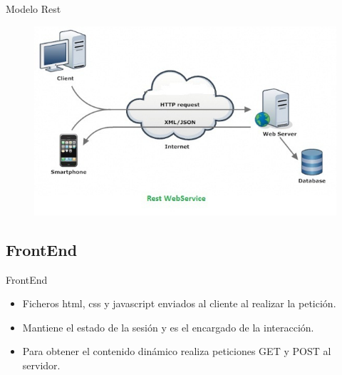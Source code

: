 \documentclass{beamer}
\begin{document}
            \begin{frame}{Modelo Rest}
                \begin{figure}
                    \centering
                    \includegraphics[width=\textwidth]{res/rest-webservices}
                \end{figure}
            \end{frame}

        \subsection{FrontEnd}

            \begin{frame}{FrontEnd}
                \begin{itemize}
                    \item Ficheros html, css y javascript enviados al cliente al realizar la petición.
                    \item Mantiene el estado de la sesión y es el encargado de la interacción.
                    \item Para obtener el contenido dinámico realiza peticiones GET y POST al servidor.
            \end{itemize}
            \end{frame}
\end{document}
